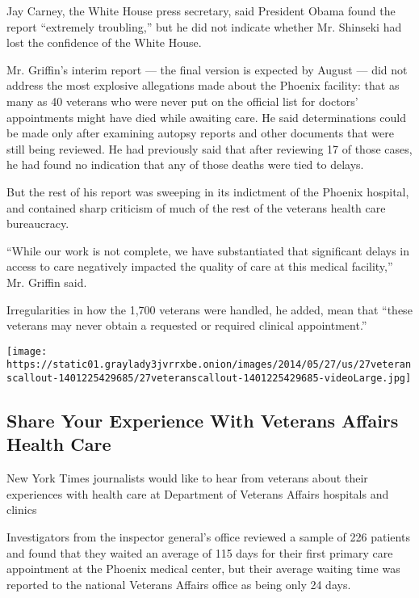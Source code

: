 Jay Carney, the White House press secretary, said President Obama found
the report ``extremely troubling,'' but he did not indicate whether Mr.
Shinseki had lost the confidence of the White House.

Mr. Griffin's interim report --- the final version is expected by August
--- did not address the most explosive allegations made about the
Phoenix facility: that as many as 40 veterans who were never put on the
official list for doctors' appointments might have died while awaiting
care. He said determinations could be made only after examining autopsy
reports and other documents that were still being reviewed. He had
previously said that after reviewing 17 of those cases, he had found no
indication that any of those deaths were tied to delays.

But the rest of his report was sweeping in its indictment of the Phoenix
hospital, and contained sharp criticism of much of the rest of the
veterans health care bureaucracy.

``While our work is not complete, we have substantiated that significant
delays in access to care negatively impacted the quality of care at this
medical facility,'' Mr. Griffin said.

Irregularities in how the 1,700 veterans were handled, he added, mean
that ``these veterans may never obtain a requested or required clinical
appointment.''

\href{https://www.nytimes3xbfgragh.onion/interactive/2014/05/27/us/27veteranscallout.html}{}

\texttt{[image: https://static01.graylady3jvrrxbe.onion/images/2014/05/27/us/27veteranscallout-1401225429685/27veteranscallout-1401225429685-videoLarge.jpg]}

\hypertarget{share-your-experience-with-veterans-affairs-health-care}{%
\subsection{Share Your Experience With Veterans Affairs Health
Care}\label{share-your-experience-with-veterans-affairs-health-care}}

New York Times journalists would like to hear from veterans about their
experiences with health care at Department of Veterans Affairs hospitals
and clinics

Investigators from the inspector general's office reviewed a sample of
226 patients and found that they waited an average of 115 days for their
first primary care appointment at the Phoenix medical center, but their
average waiting time was reported to the national Veterans Affairs
office as being only 24 days.

